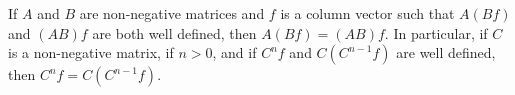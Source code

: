 If $A$ and $B$ are non-negative matrices and $f$ is a column vector such that $A(Bf)$ and $(AB)f$ are both well defined, then $A(Bf) = (AB)f$. In particular, if $C$ is a non-negative matrix, if $n > 0$, and if $C^n f$ and $C(C^{n-1}f)$ are well defined, then $C^n f = C(C^{n-1}f)$.
